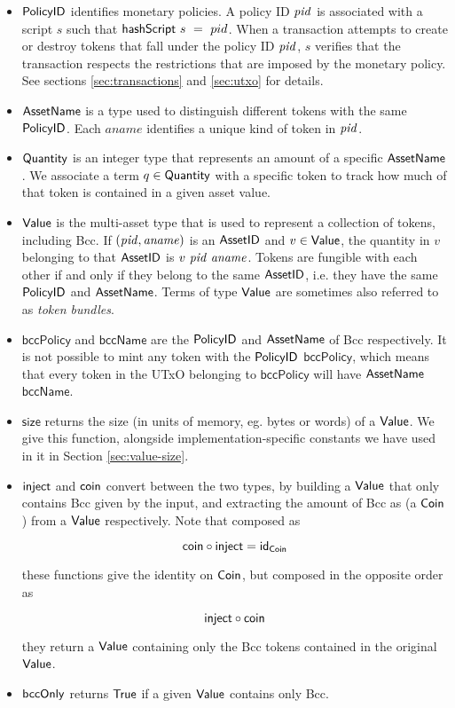 \begin{itemize}
  \item $\mathsf{PolicyID}$ identifies monetary policies. A policy ID $\mathit{pid}$ is associated with a script
    $s$ such that $\mathsf{hashScript}~s~=~pid$. When a transaction attempts to create or destroy tokens
    that fall under the policy ID $\mathit{pid}$,
    $s$ verifies that the transaction
    respects the restrictions that are imposed by the monetary policy.
    See sections \ref{sec:transactions} and \ref{sec:utxo} for details.

  \item $\mathsf{AssetName}$ is a type used to distinguish different tokens with the same $\mathsf{PolicyID}$.
    Each $aname$ identifies a unique kind of token in $\mathit{pid}$.

  \item $\mathsf{Quantity}$ is an integer type that represents an amount of a specific $\mathsf{AssetName}$. We associate
    a term $q\in\mathsf{Quantity}$ with a specific token to track how much of that token is contained in a given asset value.

  \item $\mathsf{Value}$ is the multi-asset type that is used to represent
    a collection of tokens, including Bcc. If $(\mathit{pid}, \mathit{aname})$ is an $\mathsf{AssetID}$ and $v \in \mathsf{Value}$,
    the quantity in $v$ belonging to that $\mathsf{AssetID}$ is $v~\mathit{pid}~\mathit{aname}$.
    Tokens are fungible with each other if and only if they belong to the same $\mathsf{AssetID}$,
    i.e. they have the same $\mathsf{PolicyID}$ and $\mathsf{AssetName}$. Terms of type $\mathsf{Value}$ are sometimes also referred to as
    \emph{token bundles}.

  \item $\mathsf{bccPolicy}$ and $\mathsf{bccName}$ are the $\mathsf{PolicyID}$ and $\mathsf{AssetName}$ of Bcc respectively.
    It is not possible to mint any token with the $\mathsf{PolicyID}$ $\mathsf{bccPolicy}$, which means that every
    token in the UTxO belonging to $\mathsf{bccPolicy}$ will have $\mathsf{AssetName}$ $\mathsf{bccName}$.

  \item $\mathsf{size}$ returns the size (in units of memory, eg. bytes or words) of a $\mathsf{Value}$.
  We give this function, alongside implementation-specific constants we have used in it in Section \ref{sec:value-size}.

  \item $\mathsf{inject}$ and $\mathsf{coin}$ convert between the two types,
  by building a $\mathsf{Value}$ that only contains Bcc given by the input, and extracting
  the amount of Bcc as (a $\mathsf{Coin}$) from a $\mathsf{Value}$ respectively.
  Note that composed as

  \[\mathsf{coin} \circ \mathsf{inject} = \mathsf{id}_{\mathsf{Coin}}\]

  these functions give the identity on $\mathsf{Coin}$, but composed in the opposite order as

  \[\mathsf{inject} \circ \mathsf{coin}\]

  they return a $\mathsf{Value}$ containing only the Bcc tokens contained in the original $\mathsf{Value}$.

  \item $\mathsf{bccOnly}$ returns $\mathsf{True}$ if a given $\mathsf{Value}$ contains only Bcc.
\end{itemize}

